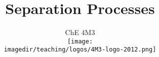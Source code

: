 \documentclass[handout, 11pt]{beamer}
\title[]{\LARGE Separation Processes}
\subtitle[]{\Large ChE 4M3 \\ \vspace{0.5cm} \texttt{[image: \\imagedir/teaching/logos/4M3-logo-2012.png]} \vspace{-1.5cm} }\author[]{}
\institute[]{}
\date[]{\copyright~ Kevin Dunn, \today \\ \vspace{1cm}{\footnotesize {\tt kevin.dunn@mcmaster.ca}\\ \href{http://learnche.mcmaster.ca/4M3}{http://learnche.mcmaster.ca/4M3}\\ \vspace{1cm}}

{\footnotesize Revision number:\hgversion (\monthname~\THEYEAR)} %
}
\begin{document}
	
\begin{frame} \titlepage \end{frame}


\end{document}
